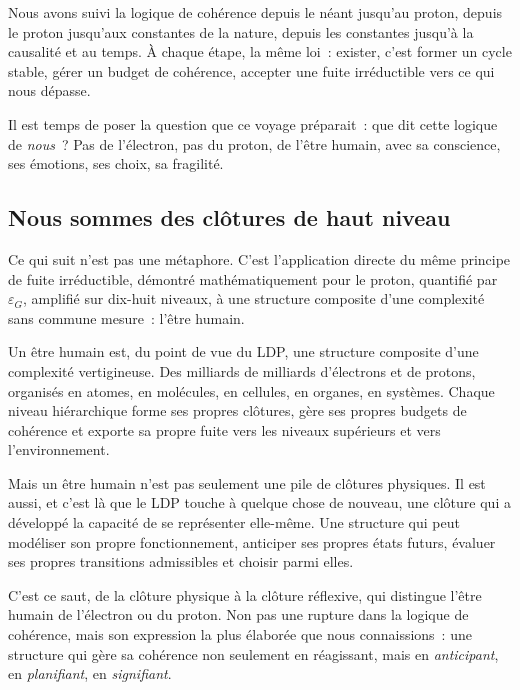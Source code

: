 \documentclass[12pt, a4paper, openright]{book}
\begin{document}
\medskip

Nous avons suivi la logique de cohérence depuis le néant jusqu'au proton, depuis le proton jusqu'aux constantes de la nature, depuis les constantes jusqu'à la causalité et au temps. À chaque étape, la même loi~: exister, c'est former un cycle stable, gérer un budget de cohérence, accepter une fuite irréductible vers ce qui nous dépasse.

\medskip

Il est temps de poser la question que ce voyage préparait~: que dit cette logique de \emph{nous}~? Pas de l'électron, pas du proton, de l'être humain, avec sa conscience, ses émotions, ses choix, sa fragilité.

\subsection*{Nous sommes des clôtures de haut niveau}

Ce qui suit n'est pas une métaphore. C'est l'application directe du même principe de fuite irréductible, démontré mathématiquement pour le proton, quantifié par $\varepsilon_G$, amplifié sur dix-huit niveaux, à une structure composite d'une complexité sans commune mesure~: l'être humain.

\medskip

Un être humain est, du point de vue du LDP, une structure composite d'une complexité vertigineuse. Des milliards de milliards d'électrons et de protons, organisés en atomes, en molécules, en cellules, en organes, en systèmes. Chaque niveau hiérarchique forme ses propres clôtures, gère ses propres budgets de cohérence et exporte sa propre fuite vers les niveaux supérieurs et vers l'environnement.

\medskip

Mais un être humain n'est pas seulement une pile de clôtures physiques. Il est aussi, et c'est là que le LDP touche à quelque chose de nouveau, une clôture qui a développé la capacité de se représenter elle-même. Une structure qui peut modéliser son propre fonctionnement, anticiper ses propres états futurs, évaluer ses propres transitions admissibles et choisir parmi elles.

\medskip

C'est ce saut, de la clôture physique à la clôture réflexive, qui distingue l'être humain de l'électron ou du proton. Non pas une rupture dans la logique de cohérence, mais son expression la plus élaborée que nous connaissions~: une structure qui gère sa cohérence non seulement en réagissant, mais en \emph{anticipant}, en \emph{planifiant}, en \emph{signifiant}.
\end{document}

